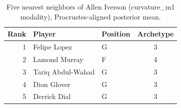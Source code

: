\begin{table}[htbp]
  \centering\small
  \begin{tabular}{rllc}
    \toprule
    Rank & Player & Position & Archetype \\
    \midrule
    1 & Felipe Lopez & G & 3 \\
    2 & Lamond Murray & F & 4 \\
    3 & Tariq Abdul-Wahad & G & 3 \\
    4 & Dion Glover & G & 3 \\
    5 & Derrick Dial & G & 3 \\
    \bottomrule
  \end{tabular}
  \caption{Five nearest neighbors of Allen Iverson (curvature_m1 modality), Procrustes-aligned posterior mean.}
  \label{tab:Allen_Iverson_neighbors_curvature_m1}
\end{table}

